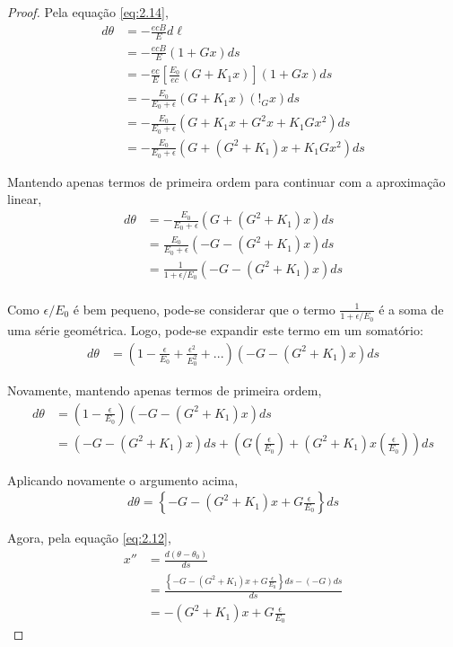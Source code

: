 \begin{proof}
	Pela equação \eqref{eq:2.14},
	\begin{align*}
		d\theta &= -\frac{ecB}{E}d\ell\\
				&= -\frac{ecB}{E}(1+Gx)ds\\
				&= -\frac{ec}{E}\left[\frac{E_0}{ec}(G+K_1x)\right](1+Gx)ds\\
				&= -\frac{E_0}{E_0+\epsilon}(G+K_1x)(!_Gx)ds\\
				&= -\frac{E_0}{E_0+\epsilon}(G+K_1x+G^2x+K_1Gx^2)ds\\
				&= -\frac{E_0}{E_0+\epsilon}(G+(G^2+K_1)x + K_1Gx^2)ds
	\end{align*}
	
	Mantendo apenas termos de primeira ordem para continuar com a aproximação linear,
	\begin{align*}
		d\theta &= -\frac{E_0}{E_0+\epsilon}(G+(G^2+K_1)x)ds\\
				&= \frac{E_0}{E_0+\epsilon}(-G-(G^2+K_1)x)ds\\
				&= \frac{1}{1+\epsilon/E_0}(-G-(G^2+K_1)x)ds\\
	\end{align*}
	
	Como $\epsilon/E_0$ é bem pequeno, pode-se considerar que o termo $\frac{1}{1+\epsilon/E_0}$ é a soma de uma série geométrica. Logo, pode-se expandir este termo em um somatório:
	\begin{align*}
		d\theta &= \left(1 - \frac{\epsilon}{E_0} + \frac{\epsilon^2}{E_0^2}+ ...\right)(-G-(G^2+K_1)x)ds
	\end{align*}
	
	Novamente, mantendo apenas termos de primeira ordem,
	\begin{align*}
		d\theta &= \left(1 - \frac{\epsilon}{E_0}\right)(-G-(G^2+K_1)x)ds\\
				&= (-G-(G^2+K_1)x)ds + \left(G\left(\frac{\epsilon}{E_0}\right)+(G^2+K_1)x\left(\frac{\epsilon}{E_0}\right)\right)ds
	\end{align*}
	
	Aplicando novamente o argumento acima,
	\begin{align*}
		d\theta = \left\{-G-(G^2+K_1)x + G\frac{\epsilon}{E_0}\right\}ds
	\end{align*}
	
	Agora, pela equação \eqref{eq:2.12},
	\begin{align*}
		x'' &= \frac{d(\theta-\theta_0)}{ds}\\
			&= \frac{\left\{-G-(G^2+K_1)x + G\frac{\epsilon}{E_0}\right\}ds - (-G)ds}{ds}\\
			&= -(G^2+K_1)x + G\frac{\epsilon}{E_0}
	\end{align*}
\end{proof}

